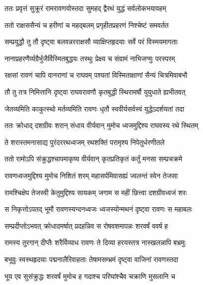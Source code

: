 
\twolineshloka
{ततः प्रवृत्तं सुक्रूरं रामरावणयोस्तदा}
{सुमहद् द्वैरथं युद्धं सर्वलोकभयावहम्} %

\twolineshloka
{ततो राक्षससैन्यं च हरीणां च महद्बलम्}
{प्रगृहीतप्रहरणं निश्चेष्टं समवर्तत} %

\twolineshloka
{सम्प्रयुद्धौ तु तौ दृष्ट्वा बलवन्नरराक्षसौ}
{व्याक्षिप्तहृदयाः सर्वे परं विस्मयमागताः} %

\twolineshloka
{नानाप्रहरणैर्व्यग्रैर्भुजैर्विस्मितबुद्धयः}
{तस्थुः प्रेक्ष्य च संग्रामं नाभिजग्मुः परस्परम्} %

\twolineshloka
{रक्षसां रावणं चापि वानराणां च राघवम्}
{पश्यतां विस्मिताक्षाणां सैन्यं चित्रमिवाबभौ} %

\twolineshloka
{तौ तु तत्र निमित्तानि दृष्ट्वा राघवरावणौ}
{कृतबुद्धी स्थिरामर्षौ युयुधाते ह्यभीतवत्} %

\twolineshloka
{जेतव्यमिति काकुत्स्थो मर्तव्यमिति रावणः}
{धृतौ स्ववीर्यसर्वस्वं युद्धेऽदर्शयतां तदा} %

\twolineshloka
{ततः क्रोधाद् दशग्रीवः शरान् संधाय वीर्यवान्}
{मुमोच ध्वजमुद्दिश्य राघवस्य रथे स्थितम्} %

\twolineshloka
{ते शरास्तमनासाद्य पुरंदररथध्वजम्}
{रथशक्तिं परामृश्य निपेतुर्धरणीतले} %

\twolineshloka
{ततो रामोऽपि संक्रुद्धश्चापमाकृष्य वीर्यवान्}
{कृतप्रतिकृतं कर्तुं मनसा सम्प्रचक्रमे} %

\twolineshloka
{रावणध्वजमुद्दिश्य मुमोच निशितं शरम्}
{महासर्पमिवासह्यं ज्वलन्तं स्वेन तेजसा} %

\twolineshloka
{रामश्चिक्षेप तेजस्वी केतुमुद्दिश्य सायकम्}
{जगाम स महीं छित्त्वा दशग्रीवध्वजं शरः} %

\twolineshloka
{स निकृत्तोऽपतद् भूमौ रावणस्यन्दनध्वजः}
{ध्वजस्योन्मथनं दृष्ट्वा रावणः स महाबलः} %

\twolineshloka
{सम्प्रदीप्तोऽभवत् क्रोधादमर्षात् प्रदहन्निव}
{स रोषवशमापन्नः शरवर्षं ववर्ष ह} %

\twolineshloka
{रामस्य तुरगान् दीप्तैः शरैर्विव्याध रावणः}
{ते दिव्या हरयस्तत्र नास्खलन्नापि बभ्रमुः} %

\twolineshloka
{बभूवुः स्वस्थहृदयाः पद्मनालैरिवाहताः}
{तेषामसम्भ्रमं दृष्ट्वा वाजिनां रावणस्तदा} %

\twolineshloka
{भूय एव सुसंक्रुद्धः शरवर्षं मुमोच ह}
{गदाश्च परिघांश्चैव चक्राणि मुसलानि च} %

